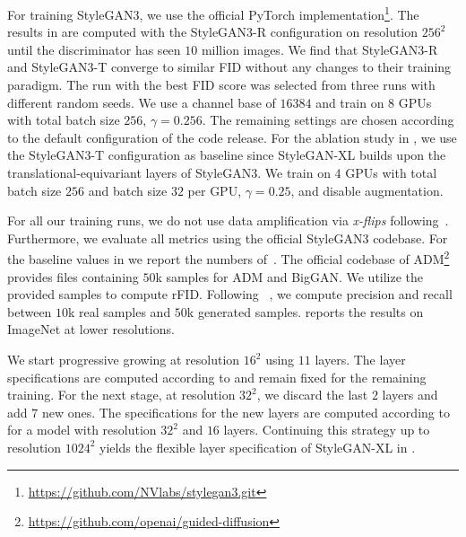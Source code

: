 For training StyleGAN3, we use the official PyTorch implementation\footnote{\url{https://github.com/NVlabs/stylegan3.git}}.
The results in 
are computed with the StyleGAN3-R configuration on resolution $256^2$ until the discriminator has seen $10$ million images. We find that StyleGAN3-R and StyleGAN3-T converge to similar FID without any changes to their training paradigm. The run with the best FID score was selected from three runs with different random seeds. We use a channel base of $16384$ and train on $8$ GPUs with total batch size $256$, $\gamma=0.256$. The remaining settings are chosen according to the default configuration of the code release.
For the ablation study in  
, we use the StyleGAN3-T configuration as baseline since StyleGAN-XL builds upon the translational-equivariant layers of StyleGAN3.
We train on $4$ GPUs with total batch size $256$ and batch size $32$ per GPU, $\gamma=0.25$, and disable augmentation.

For all our training runs, we do not use data amplification via \textit{x-flips} following~\cite{Karras2020CVPR}. Furthermore, we evaluate all metrics using the official StyleGAN3 codebase. For the baseline values in
we report the numbers of~\cite{Dhariwal2021NEURIPS}. The official codebase of ADM\footnote{\url{https://github.com/openai/guided-diffusion}} provides files containing $50$k samples for ADM and BigGAN. We utilize the provided samples to compute rFID. Following ~\cite{Dhariwal2021NEURIPS}, we compute precision and recall between $10$k real samples and $50$k generated samples.  reports the results on ImageNet at lower resolutions.

\imagenetlowres

We start progressive growing at resolution $16^2$ using $11$ layers. The layer specifications are computed according to \cite{Karras2021NEURIPS} and remain fixed for the remaining training. For the next stage, at resolution $32^2$, we discard the last $2$ layers and add $7$ new ones. The specifications for the new layers are computed according to \cite{Karras2021NEURIPS} for a model with resolution $32^2$ and $16$ layers. Continuing this strategy up to resolution $1024^2$ yields the flexible layer specification of StyleGAN-XL in .

\interpsupp
\inversion
\ffhqsamples
\pokemonsamples
\samplesa
\samplesb
\samplesc
\layerspecs